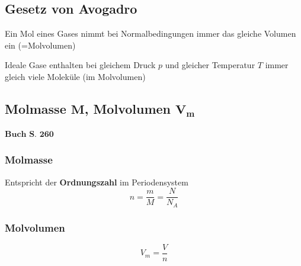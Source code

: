 \subsection{Gesetz von Avogadro}

Ein Mol eines Gases nimmt bei Normalbedingungen immer das gleiche Volumen ein (=Molvolumen) 

\medskip

Ideale Gase enthalten bei gleichem Druck $p$ und gleicher Temperatur $T$ immer gleich viele Moleküle (im Molvolumen)



\subsection[Molmasse / Molvolumen]{Molmasse $\bm{M}$, Molvolumen $\bm{V_m}$}
\begin{flushright}
	$\boxed{\textbf{Buch S. 260}}$
\end{flushright}

\begin{minipage}[t]{0.58\columnwidth}
	\subsubsection{Molmasse}

	Entspricht der \textbf{Ordnungszahl} im Periodensystem
	$$  \boxed{ n = \frac{m}{M} = \frac{N}{N_A} } $$
\end{minipage}
\hfill
\begin{minipage}[t]{0.38\columnwidth}
	\subsubsection{Molvolumen}
	
	\phantom{eifach öppis}
	$$ \boxed{ V_m = \frac{V}{n} }$$
\end{minipage}


